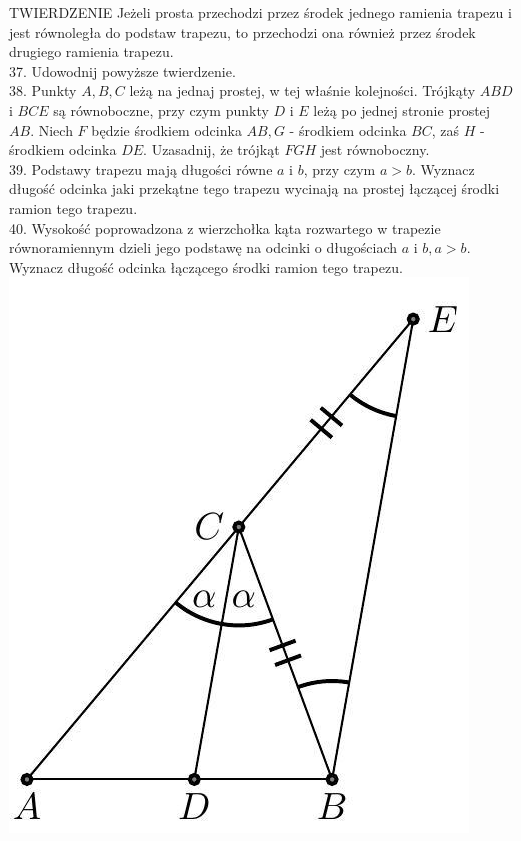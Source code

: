 \documentclass[10pt]{article}
\begin{document}
TWIERDZENIE Jeżeli prosta przechodzi przez środek jednego ramienia trapezu i jest równoległa do podstaw trapezu, to przechodzi ona również przez środek drugiego ramienia trapezu.\\
37. Udowodnij powyższe twierdzenie.\\
38. Punkty \(A, B, C\) leżą na jednaj prostej, w tej właśnie kolejności. Trójkąty \(A B D\) i \(B C E\) są równoboczne, przy czym punkty \(D\) i \(E\) leżą po jednej stronie prostej \(A B\). Niech \(F\) będzie środkiem odcinka \(A B, G\) - środkiem odcinka \(B C\), zaś \(H\) - środkiem odcinka \(D E\). Uzasadnij, że trójkąt \(F G H\) jest równoboczny.\\
39. Podstawy trapezu mają długości równe \(a\) i \(b\), przy czym \(a>b\). Wyznacz długość odcinka jaki przekątne tego trapezu wycinają na prostej łączącej środki ramion tego trapezu.\\
40. Wysokość poprowadzona z wierzchołka kąta rozwartego w trapezie równoramiennym dzieli jego podstawę na odcinki o długościach \(a\) i \(b, a>b\). Wyznacz długość odcinka łączącego środki ramion tego trapezu.\\
\includegraphics[max width=\textwidth, center]{2024_11_21_e9b4faa005d5be2cc318g-016}
\end{document}
